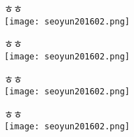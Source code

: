 ㅎㅎ\\
\texttt{[image: seoyun201602.png]}

ㅎㅎ\\
\texttt{[image: seoyun201602.png]}

ㅎㅎ\\
\texttt{[image: seoyun201602.png]}

ㅎㅎ\\
\texttt{[image: seoyun201602.png]}